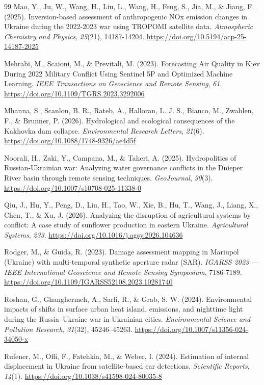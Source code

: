 \documentclass[12pt, a4paper]{article}
\begin{document}
\begin{thebibliography}{99}
Mao, Y., Ju, W., Wang, H., Liu, L., Wang, H., Feng, S., Jia, M., \& Jiang, F. (2025). Inversion-based assessment of anthropogenic NOx   emission changes in Ukraine during the 2022-2023 war using TROPOMI   satellite data. \textit{Atmospheric Chemistry and Physics}, \textit{25}(21), 14187-14204. \url{https://doi.org/10.5194/acp-25-14187-2025}

Mehrabi, M., Scaioni, M., \& Previtali, M. (2023). Forecasting Air Quality in Kiev During 2022 Military Conflict Using Sentinel 5P and Optimized Machine Learning. \textit{IEEE Transactions on Geoscience and Remote Sensing}, \textit{61}. \url{https://doi.org/10.1109/TGRS.2023.3292006}

Mhanna, S., Scanlon, B. R., Rateb, A., Halloran, L. J. S., Bianco, M., Zwahlen, F., \& Brunner, P. (2026). Hydrological and ecological consequences of the Kakhovka dam collapse. \textit{Environmental Research Letters}, \textit{21}(6). \url{https://doi.org/10.1088/1748-9326/ae4d5f}

Noorali, H., Zaki, Y., Campana, M., \& Taheri, A. (2025). Hydropolitics of Russian-Ukrainian war: Analyzing water governance conflicts in the Dnieper River basin through remote sensing techniques. \textit{GeoJournal}, \textit{90}(3). \url{https://doi.org/10.1007/s10708-025-11338-0}

Qiu, J., Hu, Y., Peng, D., Liu, H., Tao, W., Xie, B., Hu, T., Wang, J., Liang, X., Chen, T., \& Xu, J. (2026). Analyzing the disruption of agricultural systems by conflict: A case study of sunflower production in eastern Ukraine. \textit{Agricultural Systems}, \textit{233}. \url{https://doi.org/10.1016/j.agsy.2026.104636}

Rodger, M., \& Guida, R. (2023). Damage assessment mapping in Mariupol (Ukraine) with multi-temporal   synthetic aperture radar (SAR). \textit{IGARSS 2023 — IEEE International Geoscience and Remote Sensing Symposium}, 7186-7189. \url{https://doi.org/10.1109/IGARSS52108.2023.10281740}

Roshan, G., Ghanghermeh, A., Sarli, R., \& Grab, S. W. (2024). Environmental impacts of shifts in surface urban heat island, emissions, and nighttime light during the Russia–Ukraine war in Ukrainian cities. \textit{Environmental Science and Pollution Research}, \textit{31}(32), 45246--45263. \url{https://doi.org/10.1007/s11356-024-34050-x}

Rufener, M., Ofli, F., Fatehkia, M., \& Weber, I. (2024). Estimation of internal displacement in Ukraine from satellite-based car detections. \textit{Scientific Reports}, \textit{14}(1). \url{https://doi.org/10.1038/s41598-024-80035-8}


\end{thebibliography}
\end{document}
